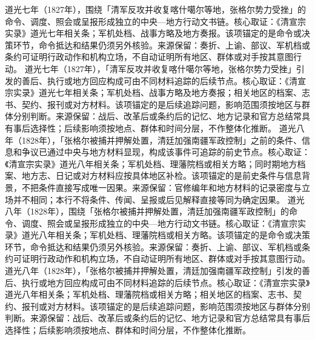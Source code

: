 道光七年（1827年），围绕「清军反攻并收复喀什噶尔等地，张格尔势力受挫」的命令、调度、照会或呈报形成独立的中央—地方行动文书链。核心取证：《清宣宗实录》道光七年相关条；军机处档、战事方略及地方奏报。该项锚定的是命令或决策环节，命令抵达和结果仍须另外核验。来源保留：奏折、上谕、部议、军机档或条约可证明行政动作和机构立场，不自动证明所有地区、群体或对手按其意图行动。
道光七年（1827年），「清军反攻并收复喀什噶尔等地，张格尔势力受挫」引发的善后、执行或地方回应构成可由不同材料追踪的后续节点。核心取证：《清宣宗实录》道光七年相关条；军机处档、战事方略及地方奏报；相关地区的档案、志书、契约、报刊或对方材料。该项锚定的是后续追踪问题，影响范围须按地区与群体分别判断。来源保留：战后、改革后或条约后的记忆、地方记录和官方总结常具有事后选择性；后续影响须按地点、群体和时间分层，不作整体化推断。
道光八年（1828年），「张格尔被捕并押解处置，清廷加强南疆军政控制」之前的条件、信息和争议已通过中央与地方材料显现，构成该事件可追踪的前史节点。核心取证：《清宣宗实录》道光八年相关条；军机处档、理藩院档或相关方略；同时期地方档案、地方志、日记或对方材料应按具体地区补检。该项锚定的是前史条件与信息背景，不把条件直接写成唯一因果。来源保留：官修编年和地方材料的记录密度与立场并不相同；本行不将条件、传闻、呈报或后见解释直接等同为确定因果。
道光八年（1828年），围绕「张格尔被捕并押解处置，清廷加强南疆军政控制」的命令、调度、照会或呈报形成独立的中央—地方行动文书链。核心取证：《清宣宗实录》道光八年相关条；军机处档、理藩院档或相关方略。该项锚定的是命令或决策环节，命令抵达和结果仍须另外核验。来源保留：奏折、上谕、部议、军机档或条约可证明行政动作和机构立场，不自动证明所有地区、群体或对手按其意图行动。
道光八年（1828年），「张格尔被捕并押解处置，清廷加强南疆军政控制」引发的善后、执行或地方回应构成可由不同材料追踪的后续节点。核心取证：《清宣宗实录》道光八年相关条；军机处档、理藩院档或相关方略；相关地区的档案、志书、契约、报刊或对方材料。该项锚定的是后续追踪问题，影响范围须按地区与群体分别判断。来源保留：战后、改革后或条约后的记忆、地方记录和官方总结常具有事后选择性；后续影响须按地点、群体和时间分层，不作整体化推断。
